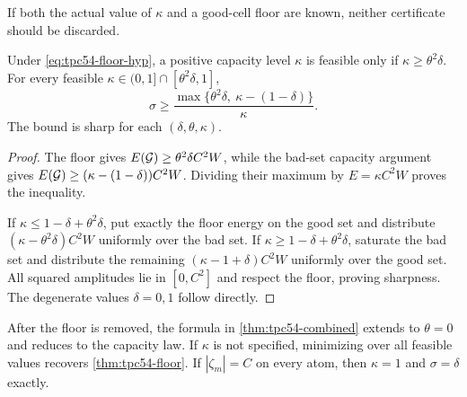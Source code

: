 If both the actual value of \(\kappa\) and a good-cell floor are known,
neither certificate should be discarded.

\begin{theorem}
\label{thm:tpc54-combined}
Under \eqref{eq:tpc54-floor-hyp}, a positive capacity level \(\kappa\) is
feasible only if \(\kappa\ge\theta^2\delta\).  For every feasible
\(\kappa\in(0,1]\cap[\theta^2\delta,1]\),
\begin{equation}
 \boxed{\quad
 \sigma\ge
 \frac{
  \max\{\theta^2\delta,\ \kappa-(1-\delta)\}}
 {\kappa}.
 \quad}
 \label{eq:tpc54-combined-bound}
\end{equation}
The bound is sharp for each \((\delta,\theta,\kappa)\).
\end{theorem}

\begin{proof}
The floor gives \(E(\mathcal G)\ge\theta^2\delta C^2W\), while the bad-set
capacity argument gives
\(E(\mathcal G)\ge(\kappa-(1-\delta))C^2W\).  Dividing their maximum by
\(E=\kappa C^2W\) proves the inequality.

If \(\kappa\le1-\delta+\theta^2\delta\), put exactly the floor energy on
the good set and distribute
\((\kappa-\theta^2\delta)C^2W\) uniformly over the bad set.  If
\(\kappa\ge1-\delta+\theta^2\delta\), saturate the bad set and distribute
the remaining \((\kappa-1+\delta)C^2W\) uniformly over the good set.
All squared amplitudes lie in \([0,C^2]\) and respect the floor, proving
sharpness.  The degenerate values \(\delta=0,1\) follow directly.
\end{proof}

After the floor is removed, the formula in
\cref{thm:tpc54-combined} extends to \(\theta=0\) and reduces to the
capacity law.
If \(\kappa\) is not specified, minimizing over all feasible values
recovers \cref{thm:tpc54-floor}.  If \(|\zeta_m|=C\) on every atom, then
\(\kappa=1\) and \(\sigma=\delta\) exactly.
